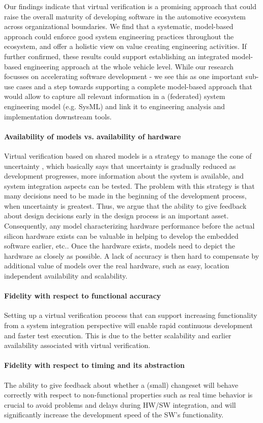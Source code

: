 Our findings indicate that virtual verification is a promising approach that could raise the overall maturity of developing software in the automotive ecosystem across organizational boundaries. We find that a systematic, model-based approach could enforce good system engineering practices throughout the ecosystem, and offer a holistic view on value creating engineering activities. If further confirmed, these results could support establishing an integrated model-based engineering approach at the whole vehicle level. While our research focusses on accelerating software development - we see this as one important sub-use cases and a step towards supporting a complete model-based approach that would allow to capture all relevant information in a (federated) system engineering model (e.g. SysML) and link it to engineering analysis and implementation downstream tools.

\paragraph{Availability of models vs. availability of hardware}
Virtual verification based on shared models is a strategy to manage the cone of uncertainty \cite{Boehm1981}, which basically says that uncertainty is gradually reduced as development progresses, more information about the system is available, and system integration aspects can be tested. The problem with this strategy is that many decisions need to be made in the beginning of the development process, when uncertainty is greatest. Thus, we argue that the ability to give feedback about design decisions early in the design process is an important asset. Consequently, any model characterizing hardware performance before the actual silicon hardware exists can be valuable in helping to develop the embedded software earlier, etc.. Once the hardware exists, models need to depict the hardware as closely as possible. A lack of accuracy is then hard to compensate by additional value of models over the real hardware, such as easy, location independent availability and scalability.

\paragraph{Fidelity with respect to functional accuracy}
Setting up a virtual verification process  that can support increasing functionality from a system integration perspective will enable rapid continuous development and faster test execution. This is due to the better scalability and earlier availability associated with virtual verification.

\paragraph{Fidelity with respect to timing and its abstraction}
The ability to give feedback about whether a (small) changeset will behave correctly with respect to non-functional properties such as real time behavior is crucial to avoid problems and delays during HW/SW integration, and will significantly increase the development speed of the SW's functionality.
